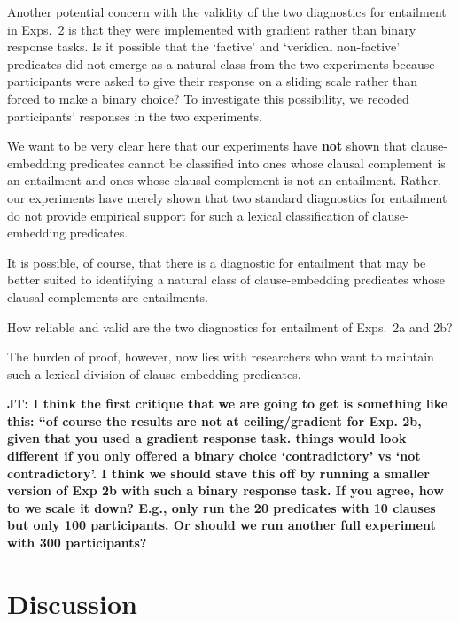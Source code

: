 \documentclass[11pt,fleqn]{article}
\newcommand{\6}{\mbox{$[\hspace*{-.6mm}[$}}
\newcommand{\9}{\mbox{$]\hspace*{-.6mm}]$}}
\newcommand{\jt}[1]{\textbf{\color{blue}JT: #1}}
\begin{document}
{Another potential concern with the validity of the two diagnostics for entailment in Exps.~2 is that they were implemented with gradient rather than binary response tasks. Is it possible that the `factive' and `veridical non-factive' predicates did not emerge as a natural class from the two experiments because participants were asked to give their response on a sliding scale rather than forced to make a binary choice? To investigate this possibility, we recoded participants' responses in the two experiments.


We want to be very clear here that our experiments have {\bf not} shown that clause-embedding predicates cannot be classified into ones whose clausal complement is an entailment and ones whose clausal complement is not an entailment. Rather, our experiments have merely shown that two standard diagnostics for entailment do not provide empirical support for such a lexical classification of clause-embedding predicates. 

It is possible, of course, that there is a diagnostic for entailment that may be better suited to identifying a natural class of clause-embedding predicates whose clausal complements are entailments. 


How reliable and valid are the two diagnostics for entailment of Exps.~2a and 2b? 

 The burden of proof, however, now lies with researchers who want to maintain such a lexical division of clause-embedding predicates. 

\jt{I think the first critique that we are going to get is something like this: ``of course the results are not at ceiling/gradient for Exp. 2b, given that you used a gradient response task. things would look different if you only offered a binary choice `contradictory' vs `not contradictory'. I think we should stave this off by running a smaller version of Exp 2b with such a binary response task. If you agree, how to we scale it down? E.g., only run the 20 predicates with 10 clauses but only 100 participants. Or should we run another full experiment with 300 participants?}

\section{Discussion}\label{s4}

}
\end{document}
